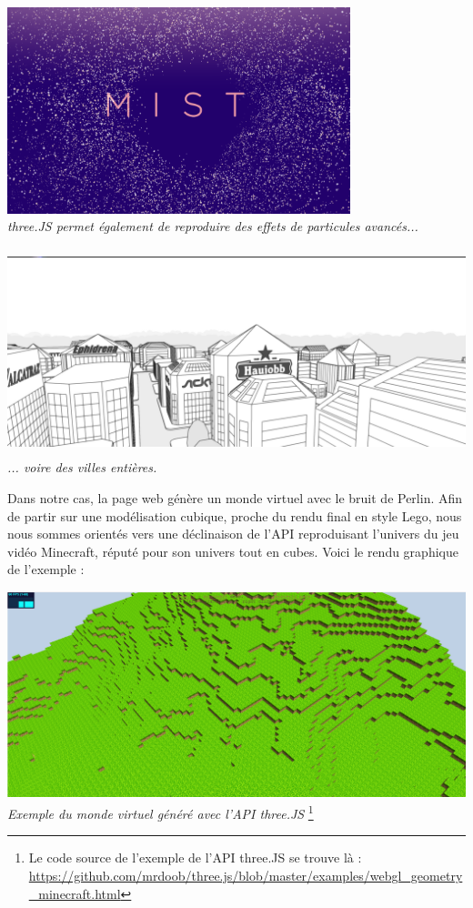 \begin{center}
	\includegraphics[height=6cm]{images/threeJS_poly_particle.png}\\
	\textit{three.JS permet également de reproduire des effets de particules avancés...}
\end{center}

\begin{center}
	\includegraphics[height=6cm]{images/threeJS_poly_city.png}\\
	\textit{... voire des villes entières.}
\end{center}



Dans notre cas, la page web génère un monde virtuel avec le bruit de Perlin. Afin de partir sur une modélisation cubique, proche du rendu final en style Lego, nous nous sommes orientés vers une déclinaison de l'API reproduisant l'univers du jeu vidéo Minecraft, réputé pour son univers tout en cubes. Voici le rendu graphique de l'exemple :

\begin{center}
	\includegraphics[height=6cm]{images/threeJS_minecraft.png}\\
	\textit{Exemple du monde virtuel généré avec l'API three.JS}
	\footnote{Le code source de l'exemple de l'API three.JS se trouve là : \url{https://github.com/mrdoob/three.js/blob/master/examples/webgl_geometry_minecraft.html}}
\end{center}

